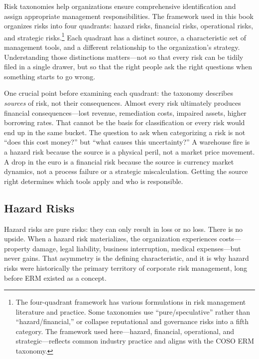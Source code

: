 \documentclass[11pt,openany]{book}
\begin{document}
Risk taxonomies help organizations ensure comprehensive identification and assign appropriate management responsibilities. The framework used in this book organizes risks into four quadrants: hazard risks, financial risks, operational risks, and strategic risks.\footnote{The four-quadrant framework has various formulations in risk management literature and practice. Some taxonomies use ``pure/speculative'' rather than ``hazard/financial,'' or collapse reputational and governance risks into a fifth category. The framework used here---hazard, financial, operational, and strategic---reflects common industry practice and aligns with the COSO ERM taxonomy.} Each quadrant has a distinct source, a characteristic set of management tools, and a different relationship to the organization's strategy. Understanding those distinctions matters---not so that every risk can be tidily filed in a single drawer, but so that the right people ask the right questions when something starts to go wrong.

One crucial point before examining each quadrant: the taxonomy describes \emph{sources} of risk, not their consequences. Almost every risk ultimately produces financial consequences---lost revenue, remediation costs, impaired assets, higher borrowing rates. That cannot be the basis for classification or every risk would end up in the same bucket. The question to ask when categorizing a risk is not ``does this cost money?'' but ``what causes this uncertainty?'' A warehouse fire is a hazard risk because the source is a physical peril, not a market price movement. A drop in the euro is a financial risk because the source is currency market dynamics, not a process failure or a strategic miscalculation. Getting the source right determines which tools apply and who is responsible.

\subsection{Hazard Risks}
\label{subsec:hazard-risks}

Hazard risks are pure risks: they can only result in loss or no loss. There is no upside. When a hazard risk materializes, the organization experiences costs---property damage, legal liability, business interruption, medical expenses---but never gains. That asymmetry is the defining characteristic, and it is why hazard risks were historically the primary territory of corporate risk management, long before ERM existed as a concept.
\end{document}

